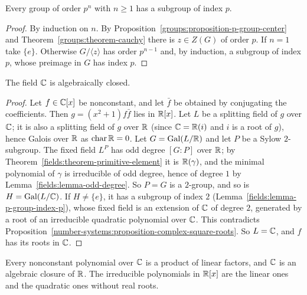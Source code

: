 \begin{lemma}\label{fields:lemma-p-group-index-p}
Every group of order $p^n$ with $n \geq 1$ has a subgroup of index $p$.
\end{lemma}

\begin{proof}
By induction on $n$. By Proposition~\ref{groups:proposition-p-group-center} and
Theorem~\ref{groups:theorem-cauchy} there is $z \in Z(G)$ of order $p$. If $n = 1$ take $\{e\}$.
Otherwise $G/\langle z \rangle$ has order $p^{n-1}$ and, by induction, a subgroup of index $p$,
whose preimage in $G$ has index $p$.
\end{proof}

\begin{theorem}\label{fields:theorem-fta}
The field $\mathbb{C}$ is algebraically closed.
\end{theorem}

\begin{proof}
Let $f \in \mathbb{C}[x]$ be nonconstant, and let $\bar f$ be obtained by conjugating the coefficients.
Then $g = (x^2 + 1) f \bar f$ lies in $\mathbb{R}[x]$. Let $L$ be a splitting field of $g$ over $\mathbb{C}$; it is also
a splitting field of $g$ over $\mathbb{R}$ (since $\mathbb{C} = \mathbb{R}(i)$ and $i$ is a root of $g$), hence Galois over
$\mathbb{R}$ as $\operatorname{char} \mathbb{R} = 0$. Let $G = \mathrm{Gal}(L/\mathbb{R})$ and let $P$ be a Sylow $2$-subgroup.
The fixed field $L^P$ has odd degree $[G : P]$ over $\mathbb{R}$; by
Theorem~\ref{fields:theorem-primitive-element} it is $\mathbb{R}(\gamma)$, and the minimal polynomial of
$\gamma$ is irreducible of odd degree, hence of degree $1$ by Lemma~\ref{fields:lemma-odd-degree}.
So $P = G$ is a $2$-group, and so is $H = \mathrm{Gal}(L/\mathbb{C})$. If $H \neq \{e\}$, it has a subgroup of
index $2$ (Lemma~\ref{fields:lemma-p-group-index-p}), whose fixed field is an extension of
$\mathbb{C}$ of degree $2$, generated by a root of an irreducible quadratic polynomial over $\mathbb{C}$. This
contradicts Proposition~\ref{number-systems:proposition-complex-square-roots}. So
$L = \mathbb{C}$, and $f$ has its roots in $\mathbb{C}$.
\end{proof}

\begin{corollary}\label{fields:corollary-real-irreducibles}
Every nonconstant polynomial over $\mathbb{C}$ is a product of linear factors, and $\mathbb{C}$ is an
algebraic closure of $\mathbb{R}$. The irreducible polynomials in $\mathbb{R}[x]$ are the linear ones and the
quadratic ones without real roots.
\end{corollary}

